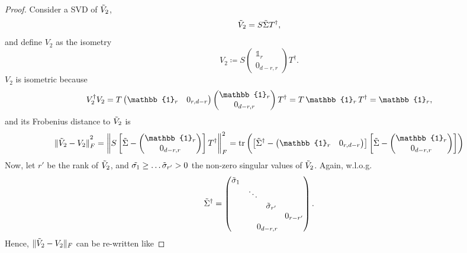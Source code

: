 \begin{proof}
Consider a SVD of $\Tilde{V}_2$,
\begin{equation*}
\Tilde{V}_2 = S\Tilde{\Sigma}T^{\dag},
\end{equation*} and define $V_2$ as the isometry
\begin{equation*}
V_2\coloneqq S \begin{pmatrix} \mathbb{1}_r \\ 0_{d-r,r} \end{pmatrix} T^{\dag}.
\end{equation*} $V_2$ is isometric because
\begin{equation*}
V_2^{\dag}V_2=T\begin{pmatrix} \mathbb{1}_r & 0_{r,d-r} \end{pmatrix} \begin{pmatrix} \mathbb{1}_r \\ 0_{d-r,r} \end{pmatrix} T^{\dag}=T\thinspace \mathbb{1}_r \thinspace T^{\dag} = \mathbb{1}_r,
\end{equation*}
and its Frobenius distance to $\Tilde{V}_2$ is
\begin{equation*}
\|\Tilde{V}_2-V_2\|_F^{\textstyle ^2} = \left\|S\left[\Tilde{\Sigma}-\begin{pmatrix}
\mathbb{1}_r \\ 0_{d-r,r}\end{pmatrix}\right]T^{\dag}\right\|_F^2=\operatorname{tr}\left(\left[\Tilde{\Sigma}^{\dag}-\begin{pmatrix} \mathbb{1}_r & 0_{r,d-r}\end{pmatrix}\right]\left[\Tilde{\Sigma}-\begin{pmatrix} \mathbb{1}_r \\ 0_{d-r,r}\end{pmatrix}\right]\right)
\end{equation*}
Now, let $r'$ be the rank of $\Tilde{V}_2$, and $\Tilde{\sigma_1}\geq\dots\Tilde{\sigma}_{r'}>0$ the non-zero singular values of $\Tilde{V}_2$. Again, w.l.o.g.\
\begin{equation*}
\Tilde{\Sigma}^{\dag}=
\begin{pmatrix}
\Tilde{\sigma}_1 &&& \\
&\ddots&& \\
&&\Tilde{\sigma}_{r'}& \\
&&&0_{r-r'}\\[0.1em]
\multicolumn{4}{c}{0_{d-r,r}}
\end{pmatrix}.
\end{equation*}
Hence, $\|\Tilde{V}_2-V_2\|_F$ can be re-written like

\end{proof}
